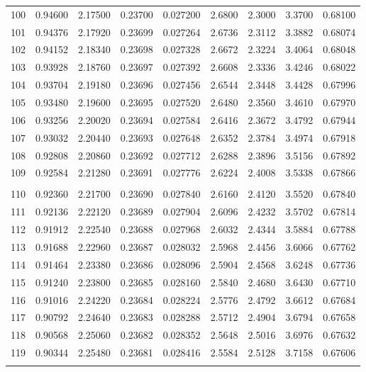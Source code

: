 \documentclass[letter,twosides,10pt]{article}
\begin{document}
\begin{longtable}{|c|c|c|c|c|c|c|c|c|}
100 & 0.94600 & 2.17500 & 0.23700 & 0.027200 & 2.6800 & 2.3000 & 3.3700 & 0.68100 \\
101 & 0.94376 & 2.17920 & 0.23699 & 0.027264 & 2.6736 & 2.3112 & 3.3882 & 0.68074 \\
102 & 0.94152 & 2.18340 & 0.23698 & 0.027328 & 2.6672 & 2.3224 & 3.4064 & 0.68048 \\
103 & 0.93928 & 2.18760 & 0.23697 & 0.027392 & 2.6608 & 2.3336 & 3.4246 & 0.68022 \\
104 & 0.93704 & 2.19180 & 0.23696 & 0.027456 & 2.6544 & 2.3448 & 3.4428 & 0.67996 \\
105 & 0.93480 & 2.19600 & 0.23695 & 0.027520 & 2.6480 & 2.3560 & 3.4610 & 0.67970 \\
106 & 0.93256 & 2.20020 & 0.23694 & 0.027584 & 2.6416 & 2.3672 & 3.4792 & 0.67944 \\
107 & 0.93032 & 2.20440 & 0.23693 & 0.027648 & 2.6352 & 2.3784 & 3.4974 & 0.67918 \\
108 & 0.92808 & 2.20860 & 0.23692 & 0.027712 & 2.6288 & 2.3896 & 3.5156 & 0.67892 \\
109 & 0.92584 & 2.21280 & 0.23691 & 0.027776 & 2.6224 & 2.4008 & 3.5338 & 0.67866 \\
 & & & & & & & & \\
110 & 0.92360 & 2.21700 & 0.23690 & 0.027840 & 2.6160 & 2.4120 & 3.5520 & 0.67840 \\
111 & 0.92136 & 2.22120 & 0.23689 & 0.027904 & 2.6096 & 2.4232 & 3.5702 & 0.67814 \\
112 & 0.91912 & 2.22540 & 0.23688 & 0.027968 & 2.6032 & 2.4344 & 3.5884 & 0.67788 \\
113 & 0.91688 & 2.22960 & 0.23687 & 0.028032 & 2.5968 & 2.4456 & 3.6066 & 0.67762 \\
114 & 0.91464 & 2.23380 & 0.23686 & 0.028096 & 2.5904 & 2.4568 & 3.6248 & 0.67736 \\
115 & 0.91240 & 2.23800 & 0.23685 & 0.028160 & 2.5840 & 2.4680 & 3.6430 & 0.67710 \\
116 & 0.91016 & 2.24220 & 0.23684 & 0.028224 & 2.5776 & 2.4792 & 3.6612 & 0.67684 \\
117 & 0.90792 & 2.24640 & 0.23683 & 0.028288 & 2.5712 & 2.4904 & 3.6794 & 0.67658 \\
118 & 0.90568 & 2.25060 & 0.23682 & 0.028352 & 2.5648 & 2.5016 & 3.6976 & 0.67632 \\
119 & 0.90344 & 2.25480 & 0.23681 & 0.028416 & 2.5584 & 2.5128 & 3.7158 & 0.67606 \\
 & & & & & & & & \\

\end{longtable}
\end{document}
